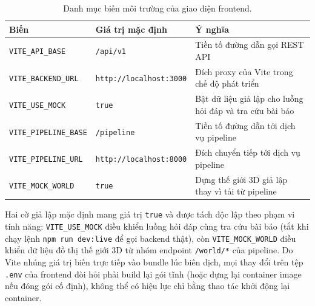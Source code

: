 \begin{table}[htbp]
    \centering
    \caption{Danh mục biến môi trường của giao diện frontend.}
    \label{tab:bien-moi-truong-fe}
    \small
    \begin{tabularx}{\textwidth}{@{}>{\raggedright\arraybackslash}p{}>{\raggedright\arraybackslash}p{}>{\raggedright\arraybackslash}X@{}}
        \toprule
        \textbf{Biến} & \textbf{Giá trị mặc định} & \textbf{Ý nghĩa} \\
        \midrule
        \texttt{VITE\_\allowbreak{}API\_\allowbreak{}BASE} & \texttt{/\allowbreak{}api/\allowbreak{}v1} & Tiền tố đường dẫn gọi REST API \\
        \texttt{VITE\_\allowbreak{}BACKEND\_\allowbreak{}URL} & \texttt{http:\allowbreak{}/\allowbreak{}/\allowbreak{}localhost:\allowbreak{}3000} & Đích proxy của Vite trong chế độ phát triển \\
        \texttt{VITE\_\allowbreak{}USE\_\allowbreak{}MOCK} & \texttt{true} & Bật dữ liệu giả lập cho luồng hỏi đáp và tra cứu bài báo \\
        \texttt{VITE\_\allowbreak{}PIPELINE\_\allowbreak{}BASE} & \texttt{/\allowbreak{}pipeline} & Tiền tố đường dẫn tới dịch vụ pipeline \\
        \texttt{VITE\_\allowbreak{}PIPELINE\_\allowbreak{}URL} & \texttt{http:\allowbreak{}/\allowbreak{}/\allowbreak{}localhost:\allowbreak{}8000} & Đích chuyển tiếp tới dịch vụ pipeline \\
        \texttt{VITE\_\allowbreak{}MOCK\_\allowbreak{}WORLD} & \texttt{true} & Dựng thế giới 3D giả lập thay vì tải từ pipeline \\
        \bottomrule
    \end{tabularx}
\end{table}

Hai cờ giả lập mặc định mang giá trị \texttt{true} và được tách độc lập theo phạm vi tính năng: \texttt{VITE\_\allowbreak{}USE\_\allowbreak{}MOCK} điều khiển luồng hỏi đáp cùng tra cứu bài báo (tắt khi chạy lệnh \texttt{npm run dev:\allowbreak{}live} để gọi backend thật), còn \texttt{VITE\_\allowbreak{}MOCK\_\allowbreak{}WORLD} điều khiển dữ liệu đồ thị thế giới 3D từ nhóm endpoint \texttt{/\allowbreak{}world/\allowbreak{}*} của pipeline. Do Vite nhúng giá trị biến trực tiếp vào bundle lúc biên dịch, mọi thay đổi trên tệp \texttt{.\allowbreak{}env} của frontend đòi hỏi phải build lại gói tĩnh (hoặc dựng lại container image nếu đóng gói cố định), không thể có hiệu lực chỉ bằng thao tác khởi động lại container.

